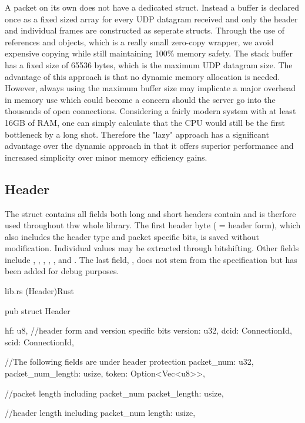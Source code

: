 A packet on its own does not have a dedicated struct. Instead a buffer is declared once as a fixed sized array for every UDP datagram received
and only the header and
individual frames are constructed as seperate structs. Through the use of references and  objects, which is a really small
zero-copy wrapper, we avoid expensive copying while still maintaining 100\% memory safety. The stack buffer has a fixed size of 65536
bytes, which is the maximum UDP datagram size. The advantage of this approach is that no dynamic memory allocation is needed. However,
always using the maximum buffer size may implicate a major overhead in memory use which could become a concern should the server go into
the thousands of open connections. Considering a fairly modern system with at least 16GB of RAM, one can simply calculate that the CPU
would still be the first bottleneck by a long shot. Therefore the "lazy" approach has a significant advantage over the dynamic approach in
that it offers superior performance and increased simplicity over minor memory efficiency gains.

\subsection{Header}

The  struct contains all fields both long and short headers contain and is therfore used throughout thw whole library.
The first header byte ( = header form), which also includes the header type and packet specific bits, is saved without
modification. Individual values may be extracted through bitshifting. Other fields include , , ,
, ,  and . The last field,
, does not stem from the specification but has been added for debug purposes.

\begin{codeblock}{lib.rs (Header)}{Rust}
  \begin{rustcode}
    pub struct Header {
        hf: u8, //header form and version specific bits
        version: u32,
        dcid: ConnectionId,
        scid: ConnectionId,
    
        //The following fields are under header protection
        packet_num: u32,
        packet_num_length: usize,
        token: Option<Vec<u8>>,
    
        //packet length including packet_num
        packet_length: usize,
    
        //header length including packet_num
        length: usize,
    }
  \end{rustcode}
\end{codeblock}

